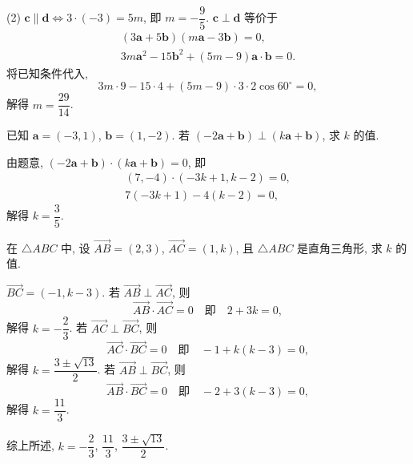     (2) $\bm{c}\parallel\bm{d}\Leftrightarrow 3\cdot(-3)= 5m$, 即 $m= -\dfrac95$.
    $\bm{c}\perp\bm{d}$ 等价于
    \[\begin{gathered}
        (3\bm{a}+5\bm{b})(m\bm{a}-3\bm{b})=0,\\
        3m\bm{a}^2- 15\bm{b}^2+ (5m-9)\bm{a}\cdot\bm{b}= 0.
    \end{gathered}\]
    将已知条件代入,
    \[3m\cdot 9- 15\cdot 4+ (5m-9)\cdot 3\cdot 2\cos60^\circ= 0,\]
    解得 $m= \dfrac{29}{14}$.
\endsolution

\lianxi
\begin{exercise}
    已知 $\bm{a}=(-3,1)$, $\bm{b}=(1,-2)$. 若 $(-2\bm{a}+\bm{b})\perp(k\bm{a}+\bm{b})$, 求 $k$ 的值.
\end{exercise}
\beginsolution
    由题意, $(-2\bm{a}+\bm{b})\cdot (k\bm{a}+\bm{b})= 0$, 即
    \[\begin{gathered}
        (7,-4)\cdot (-3k+1,k-2)= 0,\\
        7(-3k+1)- 4(k-2)= 0,
    \end{gathered}\]
    解得 $k= \dfrac35$.
\endsolution

\begin{exercise}
    在 $\triangle ABC$ 中, 设 $\overrightarrow{AB}=(2,3)$, 
    $\overrightarrow{AC}=(1,k)$, 且 $\triangle ABC$ 是直角三角形, 求 $k$ 的值.
\end{exercise}
\beginsolution
    $\overrightarrow{BC}= (-1,k-3)$. 若 $\overrightarrow{AB}\perp \overrightarrow{AC}$, 则
    \[\overrightarrow{AB}\cdot \overrightarrow{AC}= 0\quad
        \text{即}\quad 2+3k=0,\]
    解得 $k= -\dfrac23$. 若 $\overrightarrow{AC}\perp \overrightarrow{BC}$, 则
    \[\overrightarrow{AC}\cdot \overrightarrow{BC}= 0\quad
        \text{即}\quad -1+k(k-3)=0,\]
    解得 $k= \dfrac{3\pm\sqrt{13}}2$. 若 $\overrightarrow{AB}\perp \overrightarrow{BC}$, 则
    \[\overrightarrow{AB}\cdot \overrightarrow{BC}= 0\quad
        \text{即}\quad -2+3(k-3)=0,\]
    解得 $k= \dfrac{11}3$.

    综上所述, $k= -\dfrac23$, $\dfrac{11}3$, $\dfrac{3\pm\sqrt{13}}2$.
\endsolution


